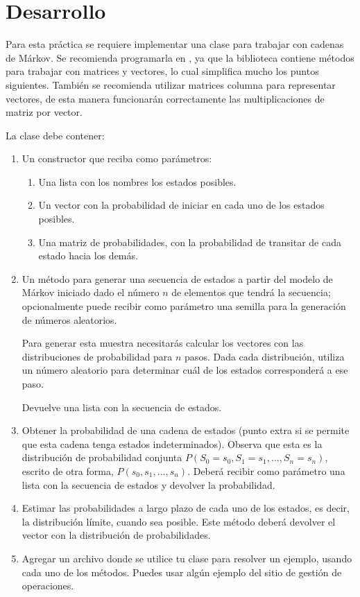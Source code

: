 \section{Desarrollo}

Para esta práctica se requiere implementar una clase para trabajar con cadenas de Márkov.  Se recomienda programarla en , ya que la biblioteca  contiene métodos para trabajar con matrices y vectores, lo cual simplifica mucho los puntos siguientes.  También se recomienda utilizar matrices columna para representar vectores, de esta manera funcionarán correctamente las multiplicaciones de matriz por vector.

La clase  debe contener:

\begin{enumerate}
 \item Un constructor que reciba como parámetros:
 \begin{enumerate}
  \item Una lista con los nombres los estados posibles.
  \item Un vector con la probabilidad de iniciar en cada uno de los estados posibles.
  \item Una matriz de probabilidades, con la probabilidad de transitar de cada estado hacia los demás.
 \end{enumerate}

 \item Un método para generar una secuencia de estados a partir del modelo de Márkov iniciado dado el número $n$ de elementos que tendrá la secuencia; opcionalmente puede recibir como parámetro una semilla para la generación de números aleatorios.
 
 Para generar esta muestra necesitarás calcular los vectores con las distribuciones de probabilidad para $n$ pasos.  Dada cada distribución, utiliza un número aleatorio para determinar cuál de los estados corresponderá a ese paso.
 
 Devuelve una lista con la secuencia de estados.
 
 \item Obtener la probabilidad de una cadena de estados (punto extra si se permite que esta cadena tenga estados indeterminados).  Observa que esta es la distribución de probabilidad conjunta $P(S_0=s_0,S_1=s_1,...,S_n=s_n)$, escrito de otra forma, $P(s_0,s_1,...,s_n)$.  Deberá recibir como parámetro una lista con la secuencia de estados y devolver la probabilidad.
 
 \item Estimar las probabilidades a largo plazo de cada uno de los estados, es decir, la distribución límite, cuando sea posible.  Este método deberá devolver el vector con la distribución de probabilidades.
 
 \item Agregar un archivo donde se utilice tu clase para resolver un ejemplo, usando cada uno de los métodos.  Puedes usar algún ejemplo del sitio de gestión de operaciones.
\end{enumerate}


